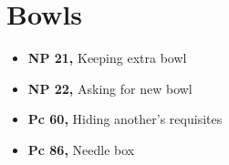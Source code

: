 \chapter{Bowls}

\begin{itemize}
\tightlist
\item
  \textbf{NP 21,} Keeping extra bowl
\item
  \textbf{NP 22,} Asking for new bowl
\item
  \textbf{Pc 60,} Hiding another's requisites
\item
  \textbf{Pc 86,} Needle box
\end{itemize}

